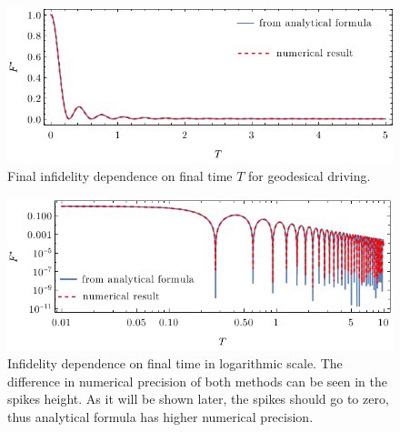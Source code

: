 \vspace{-10pt}\begin{figure}[H]
    \centering
    \includegraphics[scale=1.2]{../img/infidelityTfPlot.pdf}
    \caption{Final infidelity dependence on final time $T$ for geodesical driving.}
    \label{fig:infidelityTfPlot}
\end{figure}

\begin{figure}[H]
    \centering
    \includegraphics[scale=1.2]{../img/infidelityTfPlotLog.pdf}
    \caption{Infidelity dependence on final time in logarithmic scale. The difference in numerical precision of both methods can be seen in the spikes height. As it will be shown later, the spikes should go to zero, thus analytical formula has higher numerical precision.}
    \label{fig:infidelityTfPlotLog}
\end{figure}



